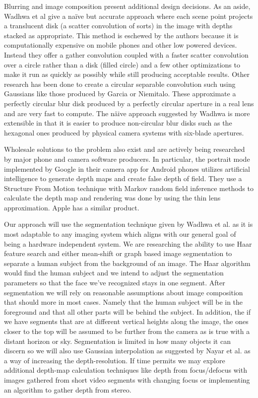 \documentclass[12pt]{article}
\begin{document}
Blurring and image composition present additional design decisions. As an aside, Wadhwa et al\autocite{Wadhwa2018} give a naïve but accurate approach where each scene point projects a translucent disk (a scatter convolution of sorts) in the image with depths stacked as appropriate. This method is eschewed by the authors because it is computationally expensive on mobile phones and other low powered devices. Instead they offer a gather convolution coupled with a faster scatter convolution over a circle rather than a disk (filled circle) and a few other optimizations to make it run as quickly as possibly while still producing acceptable results. Other research has been done to create a circular separable convolution such using Gaussians like those produced by Garcia\autocite{Garcia2017} or Niemitalo\autocite{Niemitalo2010}. These approximate a perfectly circular blur disk produced by a perfectly circular aperture in a real lens and are very fast to compute. The näive approach suggested by Wadhwa\autocite{Wadhwa2018} is more extensible in that it is easier to produce non-circular blur disks such as the hexagonal ones produced by physical camera systems with six-blade apertures.

Wholesale solutions to the problem also exist and are actively being researched by major phone and camera software producers. In particular, the portrait mode implemented by Google in their camera app for Android phones utilizes artificial intelligence to generate depth maps and create false depth of field\autocite{Hernandez2014}. They use a Structure From Motion technique with Markov random field inference methods to calculate the depth map and rendering was done by using the thin lens approximation. Apple has a similar product.

Our approach will use the segmentation technique given by Wadhwa et al.\autocite{Wadhwa2018} as it is most adaptable to any imaging system which aligns with our general goal of being a hardware independent system. We are researching the ability to use Haar feature search and either mean-shift or graph based image segmentation to separate a human subject from the background of an image. The Haar algorithm would find the human subject and we intend to adjust the segmentation parameters so that the face we've recognized stays in one segment. After segmentation we will rely on reasonable assumptions about image composition that should more in most cases. Namely that the human subject will be in the foreground and that all other parts will be behind the subject. In addition, the if we have segments that are at different vertical heights along the image, the ones closer to the top will be assumed to be further from the camera as is true with a distant horizon or sky. Segmentation is limited in how many objects it can discern so we will also use Gaussian interpolation as suggested by Nayar et al. \autocite{Nayar1994} as a way of increasing the depth-resolution. If time permits we may explore additional depth-map calculation techniques like depth from focus/defocus with images gathered from short video segments with changing focus or implementing an algorithm to gather depth from stereo.
\end{document}
